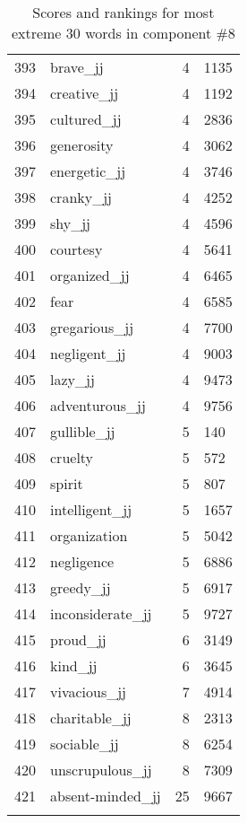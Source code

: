 \begin{longtable}[!htbp]{| rlr@{.}l |}
    393 & brave\_jj & 4 & 1135 \\
    394 & creative\_jj & 4 & 1192 \\
    395 & cultured\_jj & 4 & 2836 \\
    396 & generosity & 4 & 3062 \\
    397 & energetic\_jj & 4 & 3746 \\
    398 & cranky\_jj & 4 & 4252 \\
    399 & shy\_jj & 4 & 4596 \\
    400 & courtesy & 4 & 5641 \\
    401 & organized\_jj & 4 & 6465 \\
    402 & fear & 4 & 6585 \\
    403 & gregarious\_jj & 4 & 7700 \\
    404 & negligent\_jj & 4 & 9003 \\
    405 & lazy\_jj & 4 & 9473 \\
    406 & adventurous\_jj & 4 & 9756 \\
    407 & gullible\_jj & 5 & 140 \\
    408 & cruelty & 5 & 572 \\
    409 & spirit & 5 & 807 \\
    410 & intelligent\_jj & 5 & 1657 \\
    411 & organization & 5 & 5042 \\
    412 & negligence & 5 & 6886 \\
    413 & greedy\_jj & 5 & 6917 \\
    414 & inconsiderate\_jj & 5 & 9727 \\
    415 & proud\_jj & 6 & 3149 \\
    416 & kind\_jj & 6 & 3645 \\
    417 & vivacious\_jj & 7 & 4914 \\
    418 & charitable\_jj & 8 & 2313 \\
    419 & sociable\_jj & 8 & 6254 \\
    420 & unscrupulous\_jj & 8 & 7309 \\
    421 & absent-minded\_jj & 25 & 9667 \\
    \hline
    \caption{Scores and rankings for most extreme 30 words in component \#8} \\
\end{longtable}

